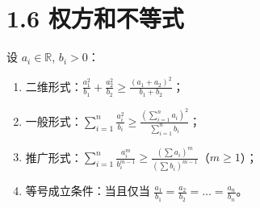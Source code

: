 \documentclass{article}
\begin{document}
\section*{1.6 权方和不等式}
设 \( a_i \in \mathbb{R} \), \( b_i > 0 \)：
\begin{enumerate}
    \item 二维形式：\( \frac{a_1^2}{b_1} + \frac{a_2^2}{b_2} \geq \frac{(a_1+a_2)^2}{b_1+b_2} \)；
    \item 一般形式：\( \sum_{i=1}^n \frac{a_i^2}{b_i} \geq \frac{(\sum_{i=1}^n a_i)^2}{\sum_{i=1}^n b_i} \)；
    \item 推广形式：\( \sum_{i=1}^n \frac{a_i^m}{b_i^{m-1}} \geq \frac{(\sum a_i)^m}{(\sum b_i)^{m-1}} \)（\( m \geq 1 \)）；
    \item 等号成立条件：当且仅当 \( \frac{a_1}{b_1} = \frac{a_2}{b_2} = \dots = \frac{a_n}{b_n} \)。
\end{enumerate}
\end{document}
